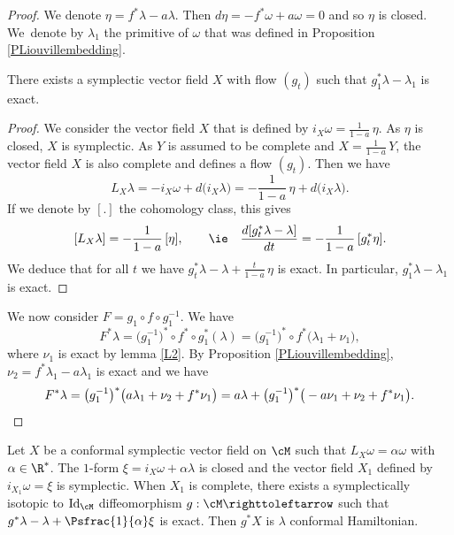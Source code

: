 \begin{proof}
We denote $\eta=f^*\lambda-a\lambda$. Then $d\eta=-f^*\omega+a\omega=0$ and so $\eta$ is closed. We~denote by $\lambda_1$ the primitive of $\omega$ that was defined in Proposition \ref{PLiouvillembedding}.

\begin{lemma}\label{L2}
There exists a symplectic vector field $X$ with flow $(g_t)$ such that $g_1^*\lambda-\lambda_1$ is exact.
\end{lemma}

\begin{proof}
We consider the vector field $X$ that is defined by $i_X\omega=\frac{1}{1-a}\,\eta$. As $\eta$ is closed, $X$ is symplectic. As $Y$ is assumed to be complete and $X=\frac{1}{1-a}\,Y$, the vector field $X$ is also complete and defines a flow $(g_t)$. Then we have\vspace*{-3pt}
\[
L_X\lambda=-i_X\omega+d\big(i_X\lambda\big)=-\frac{1}{1-a}\,\eta+d\big(i_X\lambda\big).
\]
If we denote by $[.]$ the cohomology class, this gives\vspace*{-3pt}
\[
[L_X\lambda]=-\frac{1}{1-a}\,[\eta],\qquad
\text{\ie}
\quad
\frac{d[g_t^*\lambda-\lambda]}{dt}=-\frac{1}{1-a}\,[g_t^*\eta].
\]
We deduce that for all $t$ we have
$g_t^*\lambda-\lambda+\frac{t}{1-a}\,\eta$ is exact. In particular, $g^*_1\lambda-\lambda_1$ is exact.
\end{proof}
We now consider $F=g_1\circ f\circ g_1^{-1}$. We have
\[
F^*\lambda=\big(g_1^{-1}\big)^*\circ f^*\circ g_1^*(\lambda)=\big(g_1^{-1}\big)^*\circ f^*\big( \lambda_1 +\nu_1\big),
\]
where $\nu_1$ is exact by lemma \ref{L2}. By Proposition \ref{PLiouvillembedding}, $\nu_2=f^*\lambda_1-a\lambda_1$ is exact and we have
\[
F^*\lambda=\big(g_1^{-1}\big)^* \big( a\lambda_1+\nu_2 + f^*\nu_1\big)=a\lambda+\big(g_1^{-1}\big)^{*}\big(-a\nu_1+\nu_2 + f^*\nu_1\big).\qedhere
\]
\end{proof}

\begin{proposition}\label{PCH}
Let $X$ be a conformal symplectic vector field on $\cM$ such that $L_X\omega=\alpha \omega$ with $\alpha\in\R^*$. The $1$-form $\xi=i_X\omega+\alpha\lambda$ is closed and the vector field $X_1$ defined by $i_{X_1}\omega=\xi$ is symplectic. When $X_1$ is complete, there exists a symplectically isotopic to ${\rm Id}_\cM$ diffeomorphism $g: \cM \righttoleftarrow$ such that $g^*\lambda-\lambda +\Psfrac{1}{\alpha}\xi$ is exact. Then $g^*X$ is $\lambda$ conformal Hamiltonian.
\end{proposition}

